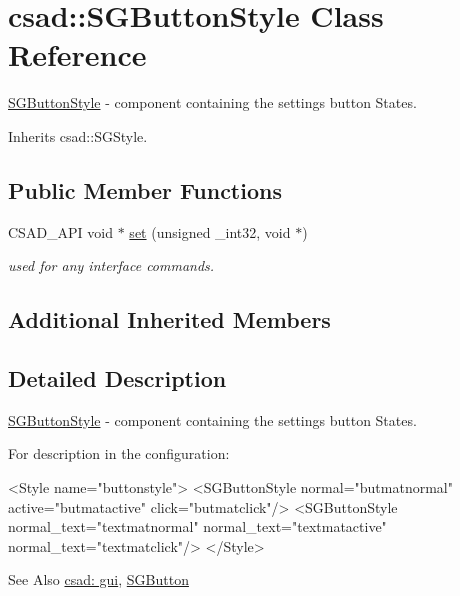 \hypertarget{classcsad_1_1_s_g_button_style}{\section{csad\-:\-:S\-G\-Button\-Style Class Reference}
\label{classcsad_1_1_s_g_button_style}
}


\hyperlink{classcsad_1_1_s_g_button_style}{S\-G\-Button\-Style} -\/ component containing the settings button States.  




Inherits csad\-::\-S\-G\-Style.

\subsection*{Public Member Functions}
\begin{DoxyCompactItemize}
\item 
\hypertarget{classcsad_1_1_s_g_button_style_ae45d6aca454954567f289daa3d0a69e8}{C\-S\-A\-D\-\_\-\-A\-P\-I void $\ast$ \hyperlink{classcsad_1_1_s_g_button_style_ae45d6aca454954567f289daa3d0a69e8}{set} (unsigned \-\_\-int32, void $\ast$)}\label{classcsad_1_1_s_g_button_style_ae45d6aca454954567f289daa3d0a69e8}

\begin{DoxyCompactList}\small\item\em used for any interface commands. \end{DoxyCompactList}\end{DoxyCompactItemize}
\subsection*{Additional Inherited Members}


\subsection{Detailed Description}
\hyperlink{classcsad_1_1_s_g_button_style}{S\-G\-Button\-Style} -\/ component containing the settings button States. 

For description in the configuration\-: \begin{DoxyVerb}  <Style name="buttonstyle">
     <SGButtonStyle normal="butmatnormal" active="butmatactive" click="butmatclick"/>
     <SGButtonStyle normal_text="textmatnormal" normal_text="textmatactive" normal_text="textmatclick"/>
  </Style>
\end{DoxyVerb}


\begin{DoxySeeAlso}{See Also}
\hyperlink{group__scenegui}{csad\-: gui}, \hyperlink{classcsad_1_1_s_g_button}{S\-G\-Button} 
\end{DoxySeeAlso}
